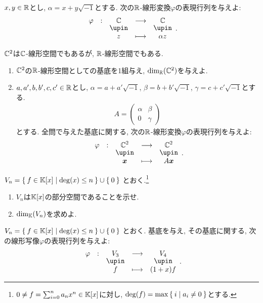 \begin{quiz}
    $x,y\in\mathbb{R}$とし,
    $\alpha=x+y\sqrt{-1}$とする.
    次の$\mathbb{R}$-線形変換$\varphi$の表現行列を与えよ:
    \begin{align*}
      \shazo{\varphi}{\CC}{\CC}
      {z}{\alpha z}.
    \end{align*}
\end{quiz}


\begin{quiz}
  $\mathbb{C}^2$は$\mathbb{C}$-線形空間でもあるが,
  $\mathbb{R}$-線形空間でもある.
  \begin{enumerate}
  \item
    $\mathbb{C}^2$の$\mathbb{R}$-線形空間としての基底を1組与え,
    $\dim_{\mathbb{R}}(\mathbb{C}^2)$を与えよ.
  \item
    $a,a',b,b',c,c'\in \mathbb{R}$とし,
    $\alpha=a+a'\sqrt{-1}$,
    $\beta=b+b'\sqrt{-1}$,
    $\gamma=c+c'\sqrt{-1}$とする.
    \begin{align*}
      A=
      \begin{pmatrix}
        \alpha&\beta\\
        0&\gamma 
      \end{pmatrix}
    \end{align*}
    とする.
  全問で与えた基底に関する,
  次の$\mathbb{R}$-線形変換$\varphi$の表現行列を与えよ:
  \begin{align*}
    \shazo{\varphi}{\CC^2}{\CC^2}
    {\xx}{A\xx}.
  \end{align*}
  \end{enumerate}
\end{quiz}

\begin{quiz}
  $V_n=\Set{f\in \mathbb{K}[x] |\deg(x) \leq n}\cup\Set{0}$
  とおく.\footnote{$0\neq f=\sum_{i=0}^n a_n x^n \in \mathbb{K}[x]$に対し, $\deg(f)=\max\Set{i|a_i \neq 0}$とする.}
  \begin{enumerate}
    \item
      $V_n$は$\mathbb{K}[x]$の部分空間であることを示せ.
    \item
      $\dim_{\mathbb{K}} (V_n)$を求めよ.
  \end{enumerate}
\end{quiz}

\begin{quiz}
  $V_n=\Set{f\in \mathbb{K}[x] |\deg(x) \leq n}\cup\Set{0}$
  とおく.
  基底を与え,
  その基底に関する,
  次の線形写像$\varphi$の表現行列を与えよ:
  \begin{align*}
    \shazo{\varphi}{V_3}{V_4}
    {f}{(1+x)f}.
  \end{align*}
\end{quiz}

